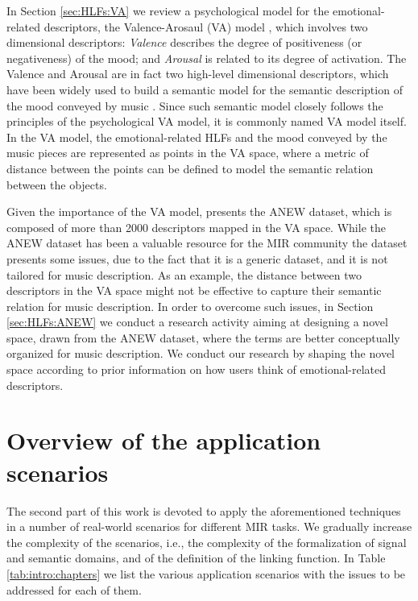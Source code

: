 In Section \ref{sec:HLFs:VA} we review a psychological model for the emotional-related descriptors, the Valence-Arosaul (VA) model \cite{Russell1980}, which involves two dimensional descriptors: \textit{Valence} describes the degree of positiveness (or negativeness) of the mood; and \textit{Arousal} is related to its degree of activation. The Valence and Arousal are in fact two high-level dimensional descriptors, which have been widely used to build a semantic model for the semantic description of the mood conveyed by music \cite{Kim2010,Weninger2014, aljanaki2015emotion}. Since such semantic model closely follows the principles of the psychological VA model, it is commonly named VA model itself. In the VA model, the emotional-related HLFs and the mood conveyed by the music pieces are represented as points in the VA space, where a metric of distance between the points can be defined to model the semantic relation between the objects. 

Given the importance of the VA model, \cite{Bradley1999} presents the ANEW dataset, which is composed of more than 2000 descriptors mapped in the VA space. While the ANEW dataset has been a valuable resource for the MIR community \cite{Kim2010,Weninger2014, aljanaki2015emotion,Yang2012, Cowie2012, Scherer2004} the dataset presents some issues, due to the fact that it is a generic dataset, and it is not tailored for music description. As an example, the distance between two descriptors in the VA space might not be effective to capture their semantic relation for music description. In order to overcome such issues, in Section \ref{sec:HLFs:ANEW} we conduct a research activity aiming at designing a novel space, drawn from the ANEW dataset, where the terms are better conceptually organized for music description. We conduct our research by shaping the novel space according to prior information on how users think of emotional-related descriptors.





\section{Overview of the application scenarios}
The second part of this work is devoted to apply the aforementioned techniques in a number of real-world scenarios for different MIR tasks.
We gradually increase the complexity of the scenarios, i.e., the complexity of the formalization of signal and semantic domains, and of the definition of the linking function.
In Table \ref{tab:intro:chapters} we list the various application scenarios with the issues to be addressed for each of them. 


